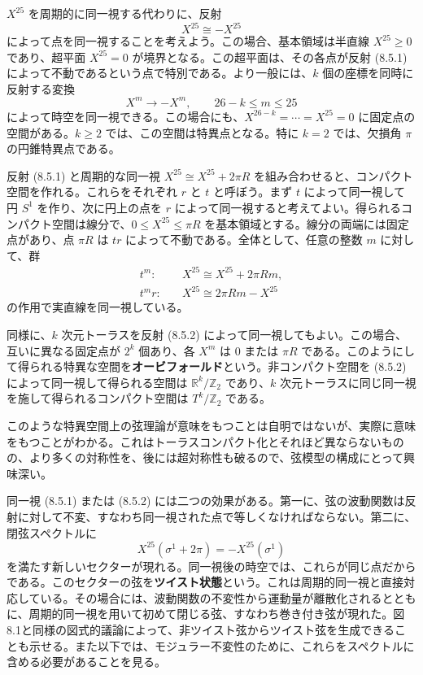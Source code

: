 \label{sec:8.5}

$X^{25}$ を周期的に同一視する代わりに、反射
\begin{equation}
X^{25}\cong-X^{25}
\tag{8.5.1}\label{eq:8.5.1}
\end{equation}
によって点を同一視することを考えよう。この場合、基本領域は半直線 $X^{25}\geq0$ であり、超平面 $X^{25}=0$ が境界となる。この超平面は、その各点が反射 (8.5.1) によって不動であるという点で特別である。より一般には、$k$ 個の座標を同時に反射する変換
\begin{equation}
X^m\longrightarrow-X^m,\qquad 26-k\leq m\leq25
\tag{8.5.2}\label{eq:8.5.2}
\end{equation}
によって時空を同一視できる。この場合にも、$X^{26-k}=\cdots=X^{25}=0$ に固定点の空間がある。$k\geq2$ では、この空間は特異点となる。特に $k=2$ では、欠損角 $\pi$ の円錐特異点である。

反射 (8.5.1) と周期的な同一視 $X^{25}\cong X^{25}+2\pi R$ を組み合わせると、コンパクト空間を作れる。これらをそれぞれ $r$ と $t$ と呼ぼう。まず $t$ によって同一視して円 $S^1$ を作り、次に円上の点を $r$ によって同一視すると考えてよい。得られるコンパクト空間は線分で、$0\leq X^{25}\leq\pi R$ を基本領域とする。線分の両端には固定点があり、点 $\pi R$ は $tr$ によって不動である。全体として、任意の整数 $m$ に対して、群
\begin{align}
t^m:\quad&X^{25}\cong X^{25}+2\pi Rm,
\tag{8.5.3a}\label{eq:8.5.3a}\\
t^mr:\quad&X^{25}\cong2\pi Rm-X^{25}
\tag{8.5.3b}\label{eq:8.5.3b}
\end{align}
の作用で実直線を同一視している。

同様に、$k$ 次元トーラスを反射 (8.5.2) によって同一視してもよい。この場合、互いに異なる固定点が $2^k$ 個あり、各 $X^m$ は $0$ または $\pi R$ である。このようにして得られる特異な空間を\textbf{オービフォールド}という。非コンパクト空間を (8.5.2) によって同一視して得られる空間は $\mathbb R^k/\mathbb Z_2$ であり、$k$ 次元トーラスに同じ同一視を施して得られるコンパクト空間は $T^k/\mathbb Z_2$ である。

このような特異空間上の弦理論が意味をもつことは自明ではないが、実際に意味をもつことがわかる。これはトーラスコンパクト化とそれほど異ならないものの、より多くの対称性を、後には超対称性も破るので、弦模型の構成にとって興味深い。

同一視 (8.5.1) または (8.5.2) には二つの効果がある。第一に、弦の波動関数は反射に対して不変、すなわち同一視された点で等しくなければならない。第二に、閉弦スペクトルに
\begin{equation}
X^{25}(\sigma^1+2\pi)=-X^{25}(\sigma^1)
\tag{8.5.4}\label{eq:8.5.4}
\end{equation}
を満たす新しいセクターが現れる。同一視後の時空では、これらが同じ点だからである。このセクターの弦を\textbf{ツイスト状態}という。これは周期的同一視と直接対応している。その場合には、波動関数の不変性から運動量が離散化されるとともに、周期的同一視を用いて初めて閉じる弦、すなわち巻き付き弦が現れた。図8.1と同様の図式的議論によって、非ツイスト弦からツイスト弦を生成できることも示せる。また以下では、モジュラー不変性のために、これらをスペクトルに含める必要があることを見る。

